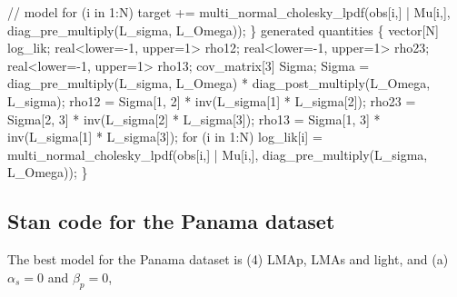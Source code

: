 \documentclass[
  12pt,
  letterpaper,
  DIV=11,
  numbers=noendperiod]{scrartcl}
\newenvironment{Shaded}{\begin{snugshade}}{\end{snugshade}}
\newcommand{\CommentTok}[1]{\textcolor[rgb]{0.37,0.37,0.37}{#1}}
\newcommand{\ControlFlowTok}[1]{\textcolor[rgb]{0.00,0.23,0.31}{#1}}
\newcommand{\DataTypeTok}[1]{\textcolor[rgb]{0.68,0.00,0.00}{#1}}
\newcommand{\DecValTok}[1]{\textcolor[rgb]{0.68,0.00,0.00}{#1}}
\newcommand{\KeywordTok}[1]{\textcolor[rgb]{0.00,0.23,0.31}{#1}}
\newcommand{\NormalTok}[1]{\textcolor[rgb]{0.00,0.23,0.31}{#1}}
\begin{document}
\begin{Shaded}
\begin{Highlighting}[]
  \CommentTok{// model}
  \ControlFlowTok{for}\NormalTok{ (i }\ControlFlowTok{in} \DecValTok{1}\NormalTok{:N)}
     \KeywordTok{target +=}\NormalTok{ multi\_normal\_cholesky\_lpdf(obs[i,] | Mu[i,], diag\_pre\_multiply(L\_sigma, L\_Omega));}
\NormalTok{\}}
\KeywordTok{generated quantities}\NormalTok{ \{}
  \DataTypeTok{vector}\NormalTok{[N] log\_lik;}
  \DataTypeTok{real}\NormalTok{\textless{}}\KeywordTok{lower}\NormalTok{={-}}\DecValTok{1}\NormalTok{, }\KeywordTok{upper}\NormalTok{=}\DecValTok{1}\NormalTok{\textgreater{} rho12;}
  \DataTypeTok{real}\NormalTok{\textless{}}\KeywordTok{lower}\NormalTok{={-}}\DecValTok{1}\NormalTok{, }\KeywordTok{upper}\NormalTok{=}\DecValTok{1}\NormalTok{\textgreater{} rho23;}
  \DataTypeTok{real}\NormalTok{\textless{}}\KeywordTok{lower}\NormalTok{={-}}\DecValTok{1}\NormalTok{, }\KeywordTok{upper}\NormalTok{=}\DecValTok{1}\NormalTok{\textgreater{} rho13;}
  \DataTypeTok{cov\_matrix}\NormalTok{[}\DecValTok{3}\NormalTok{] Sigma;}
\NormalTok{  Sigma = diag\_pre\_multiply(L\_sigma, L\_Omega)}
\NormalTok{     * diag\_post\_multiply(L\_Omega\textquotesingle{}, L\_sigma);}
\NormalTok{  rho12 = Sigma[}\DecValTok{1}\NormalTok{, }\DecValTok{2}\NormalTok{] * inv(L\_sigma[}\DecValTok{1}\NormalTok{] * L\_sigma[}\DecValTok{2}\NormalTok{]);}
\NormalTok{  rho23 = Sigma[}\DecValTok{2}\NormalTok{, }\DecValTok{3}\NormalTok{] * inv(L\_sigma[}\DecValTok{2}\NormalTok{] * L\_sigma[}\DecValTok{3}\NormalTok{]);}
\NormalTok{  rho13 = Sigma[}\DecValTok{1}\NormalTok{, }\DecValTok{3}\NormalTok{] * inv(L\_sigma[}\DecValTok{1}\NormalTok{] * L\_sigma[}\DecValTok{3}\NormalTok{]);}
  \ControlFlowTok{for}\NormalTok{ (i }\ControlFlowTok{in} \DecValTok{1}\NormalTok{:N)}
\NormalTok{   log\_lik[i] = multi\_normal\_cholesky\_lpdf(obs[i,] | Mu[i,], diag\_pre\_multiply(L\_sigma, L\_Omega));}
\NormalTok{ \}}
\end{Highlighting}
\end{Shaded}

\hypertarget{stan-code-for-the-panama-dataset}{%
\subsection{Stan code for the Panama
dataset}\label{stan-code-for-the-panama-dataset}}

The best model for the Panama dataset is (4) LMAp, LMAs and light, and
(a) \(\alpha_s = 0\) and \(\beta_p = 0\),
\end{document}
